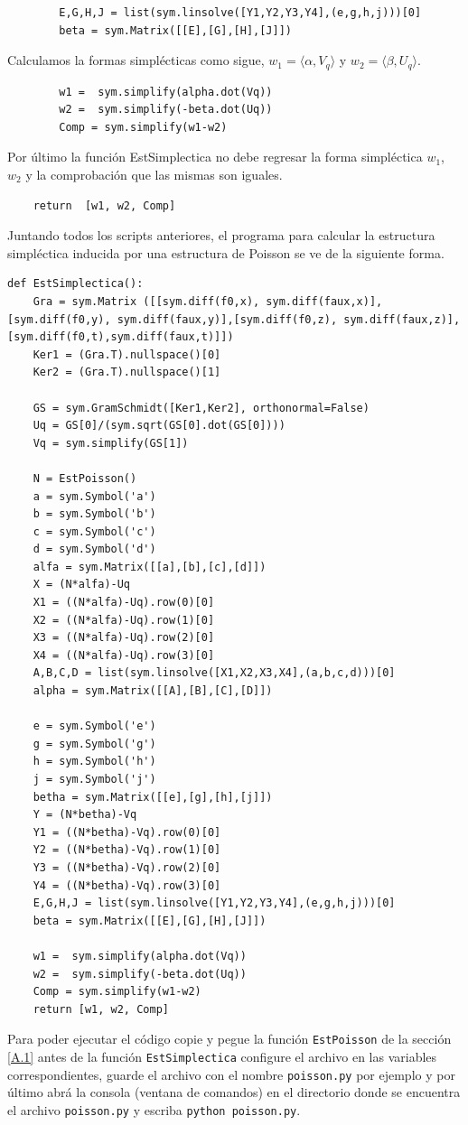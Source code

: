 \documentclass[a4paper,10pt]{book}
\begin{document}
\lstset{stepnumber=0}
\begin{lstlisting}
        E,G,H,J = list(sym.linsolve([Y1,Y2,Y3,Y4],(e,g,h,j)))[0]
        beta = sym.Matrix([[E],[G],[H],[J]])
\end{lstlisting}
Calculamos la formas simpl\'ecticas como sigue, $w_{1}=\langle\alpha,V_{q}\rangle$ y $w_{2}=\langle\beta,U_{q}\rangle$.   
\lstset{stepnumber=0}
\begin{lstlisting}
        w1 =  sym.simplify(alpha.dot(Vq))
        w2 =  sym.simplify(-beta.dot(Uq))
        Comp = sym.simplify(w1-w2)
\end{lstlisting}
Por \'ultimo la funci\'on EstSimplectica no debe regresar la forma simpl\'ectica $w_{1}$, $w_{2}$ y la comprobaci\'on que las mismas son iguales. 
\lstset{stepnumber=0}
\begin{lstlisting}
    return  [w1, w2, Comp]
\end{lstlisting}
Juntando todos los scripts anteriores, el programa para calcular la estructura simpl\'ectica inducida por una estructura de Poisson se ve de la siguiente forma.  
\lstset{stepnumber=1}
\begin{lstlisting}
def EstSimplectica():
    Gra = sym.Matrix ([[sym.diff(f0,x), sym.diff(faux,x)],[sym.diff(f0,y), sym.diff(faux,y)],[sym.diff(f0,z), sym.diff(faux,z)],[sym.diff(f0,t),sym.diff(faux,t)]])
    Ker1 = (Gra.T).nullspace()[0]
    Ker2 = (Gra.T).nullspace()[1]
    
    GS = sym.GramSchmidt([Ker1,Ker2], orthonormal=False)
    Uq = GS[0]/(sym.sqrt(GS[0].dot(GS[0])))
    Vq = sym.simplify(GS[1])
     
    N = EstPoisson()
    a = sym.Symbol('a')
    b = sym.Symbol('b')
    c = sym.Symbol('c')
    d = sym.Symbol('d') 
    alfa = sym.Matrix([[a],[b],[c],[d]])
    X = (N*alfa)-Uq
    X1 = ((N*alfa)-Uq).row(0)[0]
    X2 = ((N*alfa)-Uq).row(1)[0]
    X3 = ((N*alfa)-Uq).row(2)[0]
    X4 = ((N*alfa)-Uq).row(3)[0]
    A,B,C,D = list(sym.linsolve([X1,X2,X3,X4],(a,b,c,d)))[0]
    alpha = sym.Matrix([[A],[B],[C],[D]])
    
    e = sym.Symbol('e')
    g = sym.Symbol('g')
    h = sym.Symbol('h')
    j = sym.Symbol('j')            
    betha = sym.Matrix([[e],[g],[h],[j]])
    Y = (N*betha)-Vq
    Y1 = ((N*betha)-Vq).row(0)[0]
    Y2 = ((N*betha)-Vq).row(1)[0]
    Y3 = ((N*betha)-Vq).row(2)[0]
    Y4 = ((N*betha)-Vq).row(3)[0]
    E,G,H,J = list(sym.linsolve([Y1,Y2,Y3,Y4],(e,g,h,j)))[0]
    beta = sym.Matrix([[E],[G],[H],[J]])
    
    w1 =  sym.simplify(alpha.dot(Vq))
    w2 =  sym.simplify(-beta.dot(Uq))
    Comp = sym.simplify(w1-w2)  
	return [w1, w2, Comp] 
\end{lstlisting}
Para poder ejecutar el c\'odigo copie y pegue la funci\'on \texttt{EstPoisson} de la secci\'on \ref{A.1} antes de la funci\'on \texttt{EstSimplectica} configure el archivo en las variables correspondientes, guarde el archivo con el nombre \texttt{poisson.py} por ejemplo y por \'ultimo abr\'a la consola (ventana de comandos) en el directorio donde se encuentra el archivo \texttt{poisson.py} y escriba \texttt{python poisson.py}.  
\end{document}
